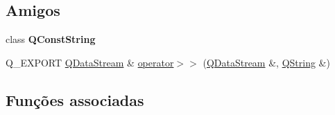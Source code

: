 \subsection*{Amigos}
\begin{DoxyCompactItemize}
\item 
\hypertarget{class_q_string_aff7e2646af69210685c894cbc1646332}{class {\bfseries Q\-Const\-String}}\label{class_q_string_aff7e2646af69210685c894cbc1646332}

\item 
Q\-\_\-\-E\-X\-P\-O\-R\-T \hyperlink{class_q_data_stream}{Q\-Data\-Stream} \& \hyperlink{class_q_string_ae8d642385fbe1a96358fe7432baf546b}{operator$>$$>$} (\hyperlink{class_q_data_stream}{Q\-Data\-Stream} \&, \hyperlink{class_q_string}{Q\-String} \&)
\end{DoxyCompactItemize}
\subsection*{Funções associadas}

